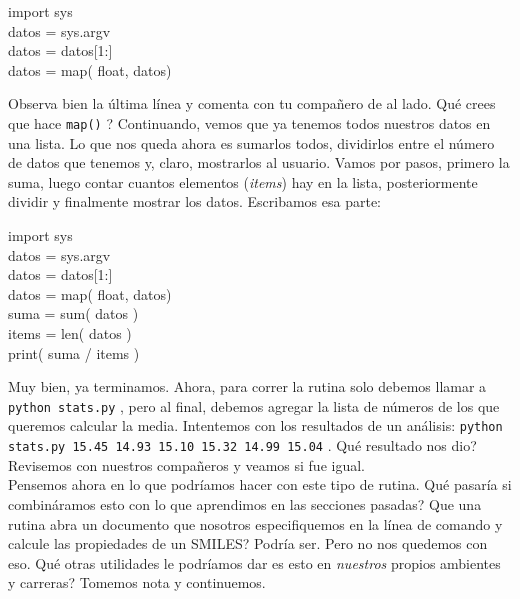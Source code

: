 \documentclass[10pt,letterpaper]{article}
\newcommand{\inlinecode}[1]{
\colorbox{light-gray}{\texttt{#1}}
}
\newenvironment{Code}
{
\begin{lrbox}{\selvestebox}%
\begin{minipage}{\dimexpr\columnwidth-2\fboxsep\relax}
\fontfamily{\ttdefault}\selectfont
}
{\end{minipage}\end{lrbox}%
\begin{center}
\colorbox{light-gray}{\usebox{\selvestebox}}
\end{center}
}
\begin{document}
\begin{Code}
import sys\\
datos = sys.argv\\
datos = datos[1:]\\
datos = map( float, datos)
\end{Code}

Observa bien la \'ultima l\'inea y comenta con tu compa\~nero de al lado. Qu\'e crees que hace \inlinecode{map()}? Continuando, vemos que ya tenemos todos nuestros datos en una lista. Lo que nos queda ahora es sumarlos todos, dividirlos entre el n\'umero de datos que tenemos y, claro, mostrarlos al usuario. Vamos por pasos, primero la suma, luego contar cuantos elementos (\textit{items}) hay en la lista, posteriormente dividir y finalmente mostrar los datos. Escribamos esa parte:

\begin{Code}
import sys\\
datos = sys.argv\\
datos = datos[1:]\\
datos = map( float, datos)\\
suma = sum( datos )\\
items = len( datos )\\
print( suma / items )
\end{Code}

Muy bien, ya terminamos. Ahora, para correr la rutina solo debemos llamar a \inlinecode{python stats.py}, pero al final, debemos agregar la lista de n\'umeros de los que queremos calcular la media. Intentemos con los resultados de un an\'alisis:  \inlinecode{python stats.py 15.45 14.93 15.10 15.32 14.99 15.04}. Qu\'e resultado nos dio? Revisemos con nuestros compa\~neros y veamos si fue igual.\\

Pensemos ahora en lo que podr\'iamos hacer con este tipo de rutina. Qu\'e pasar\'ia si combin\'aramos esto con lo que aprendimos en las secciones pasadas? Que una rutina abra un documento que nosotros especifiquemos en la l\'inea de comando y calcule las propiedades de un SMILES? Podr\'ia ser. Pero no nos quedemos con eso. Qu\'e otras utilidades le podr\'iamos dar es esto en \emph{nuestros} propios ambientes y carreras? Tomemos nota y continuemos.

\pagebreak
\end{document}
